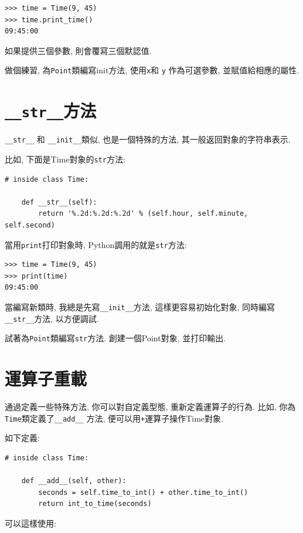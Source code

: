 \documentclass[10pt]{book}
\begin{document}
\begin{verbatim}
>>> time = Time(9, 45)
>>> time.print_time()
09:45:00
\end{verbatim}
%
如果提供三個參數, 則會覆寫三個默認值. 

做個練習, 為{\tt Point}類編寫init方法, 使用{\tt x}和 {\tt y} 作為可選參數, 
並賦值給相應的屬性. 


\section{{\tt \_\_str\_\_}方法}

\verb"__str__" 和 \verb"__init__"類似, 也是一個特殊的方法, 
其一般返回對象的字符串表示. 

比如, 下面是Time對象的{\tt str}方法:

\begin{verbatim}
# inside class Time:

    def __str__(self):
        return '%.2d:%.2d:%.2d' % (self.hour, self.minute, self.second)
\end{verbatim}
%
當用{\tt print}打印對象時, Python調用的就是{\tt str}方法:

\begin{verbatim}
>>> time = Time(9, 45)
>>> print(time)
09:45:00
\end{verbatim}
%
當編寫新類時, 我總是先寫\verb"__init__"方法, 這樣更容易初始化對象, 
同時編寫\verb"__str__"方法, 以方便調試. 

試著為{\tt Point}類編寫{\tt str}方法. 
創建一個Point對象, 並打印輸出. 


\section{運算子重載}
\label{operator.overloading}

通過定義一些特殊方法, 你可以對自定義型態, 重新定義運算子的行為. 
比如, 你為{\tt Time}類定義了\verb"__add__" 方法, 便可以用{\tt +}運算子操作Time對象. 

如下定義:

\begin{verbatim}
# inside class Time:

    def __add__(self, other):
        seconds = self.time_to_int() + other.time_to_int()
        return int_to_time(seconds)
\end{verbatim}
%
可以這樣使用:
\end{document}
